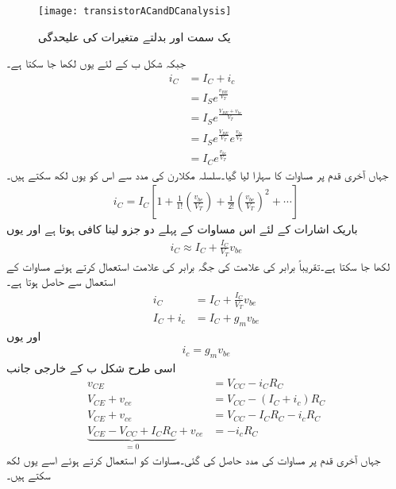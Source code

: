 \begin{figure}
\centering
\texttt{[image: transistorACandDCanalysis]}
\caption{یک سمت اور بدلتے متغیرات کی علیحدگی}
\label{شکل_ٹرانزسٹر_یک_سمتی_اور_بدلتے_متغیرات_کی_علیحدگی}
\end{figure}
جبکہ شکل  ب کے لئے یوں لکھا جا سکتا ہے۔
\begin{align*}
i_C&=I_C+i_c\\
&=I_S e^{\frac{v_{BE}}{V_T}}\\
&=I_S e^{\frac{V_{BE}+v_{be}}{V_T}}\\
&=I_S e^{\frac{V_{BE}}{V_T}} e^{\frac{v_{be}}{V_T}}\\
&=I_C e^{\frac{v_{be}}{V_T}}
\end{align*}
جہاں آخری قدم پر مساوات   کا سہارا لیا گیا۔سلسلہ مکلارن کی مدد سے اس کو یوں لکھ سکتے ہیں۔
\begin{align*}
i_C = I_C \left [1+\frac{1}{1!}\left(\frac{v_{be}}{V_T} \right )+\frac{1}{2!}\left(\frac{v_{be}}{V_T}\right )^{2}+\cdots \right ]
\end{align*}
باریک اشارات کے لئے اس مساوات کے پہلے دو جزو لینا کافی ہوتا ہے اور یوں
\begin{align*}
i_C \approx I_C +\frac{I_C}{V_T}v_{be}
\end{align*}
لکھا جا سکتا ہے۔تقریباً برابر کی علامت  کی جگہ برابر کی علامت  استعمال کرتے ہوئے  مساوات   کے استعمال سے حاصل ہوتا ہے۔
\begin{align*}
i_C  & = I_C + \frac{I_C}{V_T} v_{be} \\
I_C+i_c &= I_C +g_m v_{be}
\end{align*}
اور یوں
\begin{align} \label{مساوات_ٹرانزسٹر_اشارہ_موجود_لہذا_بدلتی_رو}
i_c = g_m v_{be}
\end{align}
اسی طرح شکل  ب کے خارجی جانب
\begin{align*}
v_{CE} &=V_{CC}-i_C R_C \\
V_{CE}+v_{ce} &= V_{CC}-(I_C+i_c) R_C \\
V_{CE}+v_{ce} &=V_{CC}-I_C R_C -i_c R_C\\
\underbrace{V_{CE}-V_{CC}+I_C R_C}_{=0}+v_{ce} &=- i_c R_C
\end{align*}
جہاں آخری قدم پر مساوات  کی مدد حاصل کی گئی۔مساوات   کو استعمال کرتے ہوئے اسے  یوں لکھ سکتے ہیں۔
